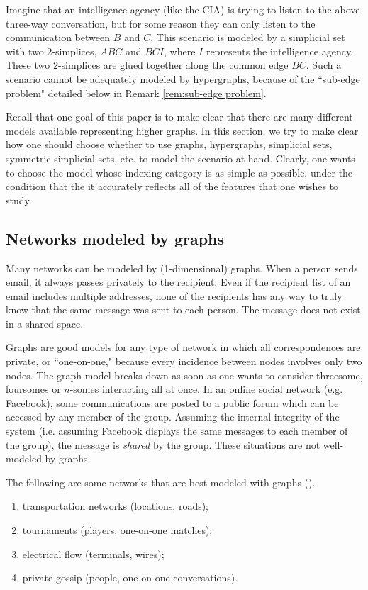 \documentclass{amsart}
\begin{document}
Imagine that an intelligence agency (like the CIA) is trying to listen to the above three-way conversation, but for some reason they can only listen to the communication between $B$ and $C$.  This scenario is modeled by a simplicial set with two 2-simplices, $ABC$ and $BCI$, where $I$ represents the intelligence agency.  These two 2-simplices are glued together along the common edge $BC$.  Such a scenario cannot be adequately modeled by hypergraphs, because of the ``sub-edge problem" detailed below in Remark \ref{rem:sub-edge problem}. 

Recall that one goal of this paper is to make clear that there are many different models available representing higher graphs.  In this section, we try to make clear how one should choose whether to use graphs, hypergraphs, simplicial sets, symmetric simplicial sets, etc. to model the scenario at hand.  Clearly, one wants to choose the model whose indexing category is as simple as possible, under the condition that the it accurately reflects all of the features that one wishes to study.

\subsection{Networks modeled by graphs}

Many networks can be modeled by (1-dimensional) graphs.  When a person sends email, it always passes privately to the recipient.  Even if the recipient list of an email includes multiple addresses, none of the recipients has any way to truly know that the same message was sent to each person.  The message does not exist in a shared space.

Graphs are good models for any type of network in which all correspondences are private, or ``one-on-one," because every incidence between nodes involves only two nodes.  The graph model breaks down as soon as one wants to consider threesome, foursomes or $n$-somes interacting all at once.  In an online social network (e.g. Facebook), some communications are posted to a public forum which can be accessed by any member of the group.  Assuming the internal integrity of the system (i.e. assuming Facebook displays the same messages to each member of the group), the message is {\em shared} by the group.  These situations are not well-modeled by graphs.  

The following are some networks that are best modeled with graphs (\cite{BG}).

\begin{enumerate}

\item transportation networks (locations, roads);
\item tournaments (players, one-on-one matches);
\item electrical flow (terminals, wires);
\item private gossip (people, one-on-one conversations).

\end{enumerate}
\end{document}
